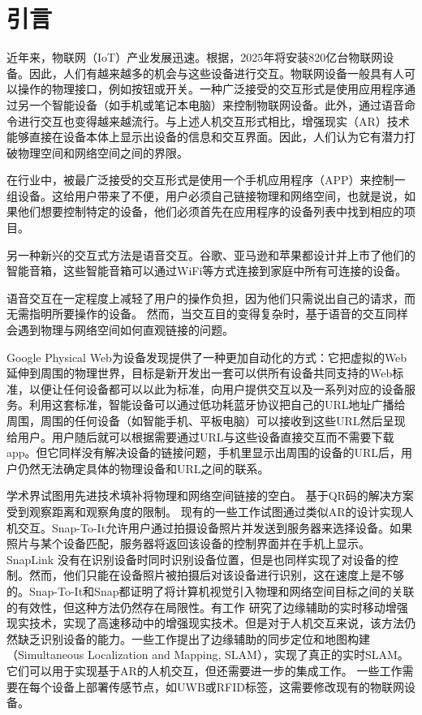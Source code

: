 \def\fr{30}
\def\edg{边缘服务端}
\def\fr{10}
\def\acc{72.7\%}
\def\idenT{93毫秒}
\def\uiT{20秒}

\chapter{引言}
\label{chap:introduction}
近年来，物联网（IoT）产业发展迅速。根据\cite{macgillivray2019worldwide}，2025年将安装820亿台物联网设备。因此，人们有越来越多的机会与这些设备进行交互。物联网设备一般具有人可以操作的物理接口，例如按钮或开关。一种广泛接受的交互形式是使用应用程序通过另一个智能设备（如手机或笔记本电脑）来控制物联网设备\cite{homeass,xiaomi}。此外，通过语音命令进行交互也变得越来越流行\cite{li2019iot,porcheron2018voice}。与上述人机交互形式相比，增强现实（AR）技术能够直接在设备本体上显示出设备的信息和交互界面。因此，人们认为它有潜力打破物理空间和网络空间之间的界限。

在行业中，被最广泛接受的交互形式是使用一个手机应用程序（APP）来控制一组设备。这给用户带来了不便，用户必须自己链接物理和网络空间，也就是说，如果他们想要控制特定的设备，他们必须首先在应用程序的设备列表中找到相应的项目。

另一种新兴的交互式方法是语音交互。谷歌、亚马逊和苹果都设计并上市了他们的智能音箱\cite{googlehome,AmazonEcho,apple-homepod}，这些智能音箱可以通过WiFi等方式连接到家庭中所有可连接的设备。

语音交互在一定程度上减轻了用户的操作负担，因为他们只需说出自己的请求，而无需指明所要操作的设备。
然而，当交互目的变得复杂时，基于语音的交互同样会遇到物理与网络空间如何直观链接的问题。

Google Physical Web\cite{jenson2014physical}为设备发现提供了一种更加自动化的方式：它把虚拟的Web延伸到周围的物理世界，目标是新开发出一套可以供所有设备共同支持的Web标准，以便让任何设备都可以以此为标准，向用户提供交互以及一系列对应的设备服务。利用这套标准，智能设备可以通过低功耗蓝牙协议把自己的URL地址广播给周围，周围的任何设备（如智能手机、平板电脑）可以接收到这些URL然后呈现给用户。用户随后就可以根据需要通过URL与这些设备直接交互而不需要下载app。但它同样没有解决设备的链接问题，手机里显示出周围的设备的URL后，用户仍然无法确定具体的物理设备和URL之间的联系。

学术界试图用先进技术填补将物理和网络空间链接的空白。
基于QR码的解决方案受到观察距离和观察角度的限制。
现有的一些工作试图通过类似AR的设计实现人机交互\cite{de2016snap,chen2018snaplink}。Snap-To-It\cite{de2016snap}允许用户通过拍摄设备照片并发送到服务器来选择设备。如果照片与某个设备匹配，服务器将返回该设备的控制界面并在手机上显示。SnapLink\cite{chen2018snaplink} 没有在识别设备时同时识别设备位置，但是也同样实现了对设备的控制。然而，他们只能在设备照片被拍摄后对该设备进行识别，这在速度上是不够的。Snap-To-It和Snap都证明了将计算机视觉引入物理和网络空间目标之间的关联的有效性，但这种方法仍然存在局限性。有工作\cite{liu2019edge} 研究了边缘辅助的实时移动增强现实技术，实现了高速移动中的增强现实技术。但是对于人机交互来说，该方法仍然缺乏识别设备的能力。一些工作\cite{ben2020edge,xu2020edge,liu2021edgesharing}提出了边缘辅助的同步定位和地图构建（Simultaneous Localization and Mapping, SLAM），实现了真正的实时SLAM。它们可以用于实现基于AR的人机交互，但还需要进一步的集成工作。
一些工作\cite{alanwar2017selecon}需要在每个设备上部署传感节点，如UWB或RFID标签，这需要修改现有的物联网设备。

